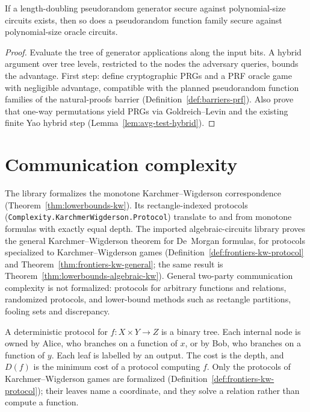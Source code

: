 \begin{theorem}
  \label{thm:frontiers-ggm}
  \notready
  If a length-doubling pseudorandom generator secure against polynomial-size
  circuits exists, then so does a pseudorandom function family secure against
  polynomial-size oracle circuits.
\end{theorem}
\begin{proof}
  Evaluate the tree of generator applications along the input bits. A hybrid
  argument over tree levels, restricted to the nodes the adversary queries,
  bounds the advantage. First step: define cryptographic PRGs and a PRF oracle
  game with negligible advantage, compatible with the planned pseudorandom
  function families of the natural-proofs barrier
  (Definition~\ref{def:barriers-prf}). Also prove that one-way permutations
  yield PRGs via Goldreich--Levin and the existing finite Yao hybrid step
  (Lemma~\ref{lem:avg-test-hybrid}).
\end{proof}

\section{Communication complexity}

The library formalizes the monotone Karchmer--Wigderson correspondence
(Theorem~\ref{thm:lowerbounds-kw}). Its rectangle-indexed protocols
(\texttt{Complexity.KarchmerWigderson.Protocol}) translate to and from monotone
formulas with exactly equal depth. The imported algebraic-circuits library
proves the general Karchmer--Wigderson theorem for De~Morgan formulas, for
protocols specialized to Karchmer--Wigderson games
(Definition~\ref{def:frontiers-kw-protocol} and
Theorem~\ref{thm:frontiers-kw-general}; the same result is
Theorem~\ref{thm:lowerbounds-algebraic-kw}). General two-party communication
complexity is not formalized: protocols for arbitrary functions and relations,
randomized protocols, and lower-bound methods such as rectangle partitions,
fooling sets and discrepancy.

\begin{definition}
  \label{def:frontiers-protocol}
  A deterministic protocol for $f : X \times Y \to Z$ is a binary tree. Each
  internal node is owned by Alice, who branches on a function of $x$, or by Bob,
  who branches on a function of $y$. Each leaf is labelled by an output. The
  cost is the depth, and $D(f)$ is the minimum cost of a protocol computing $f$.
  Only the protocols of Karchmer--Wigderson games are formalized
  (Definition~\ref{def:frontiers-kw-protocol}); their leaves name a
  coordinate, and they solve a relation rather than compute a function.
\end{definition}

